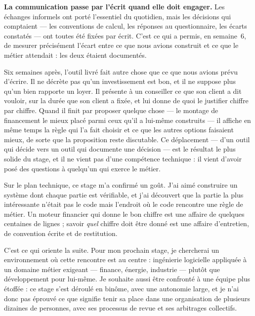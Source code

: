 \documentclass[12pt,a4paper]{article}
\begin{document}
\textbf{La communication passe par l'écrit quand elle doit engager.} Les
échanges informels ont porté l'essentiel du quotidien, mais les décisions qui
comptaient --- les conventions de calcul, les réponses au questionnaire, les
écarts constatés --- ont toutes été fixées par écrit. C'est ce qui a permis, en
semaine~6, de mesurer précisément l'écart entre ce que nous avions construit et
ce que le métier attendait : les deux étaient documentés.


Six semaines après, l'outil livré fait autre chose que ce que nous avions prévu
d'écrire. Il ne décrète pas qu'un investissement est bon, et il ne suppose plus
qu'un bien rapporte un loyer. Il présente à un conseiller ce que son client a dit
vouloir, sur la durée que son client a fixée, et lui donne de quoi le justifier
chiffre par chiffre. Quand il finit par proposer quelque chose --- le montage de
financement le mieux placé parmi ceux qu'il a lui-même construits --- il affiche
en même temps la règle qui l'a fait choisir et ce que les autres options
faisaient mieux, de sorte que la proposition reste discutable. Ce déplacement --- d'un outil qui décide
vers un outil qui documente une décision --- est le résultat le plus solide du
stage, et il ne vient pas d'une compétence technique : il vient d'avoir posé des
questions à quelqu'un qui exerce le métier.

Sur le plan technique, ce stage m'a confirmé un goût. J'ai aimé construire un
système dont chaque partie est vérifiable, et j'ai découvert que la partie la
plus intéressante n'était pas le code mais l'endroit où le code rencontre une
règle de métier. Un moteur financier qui donne le bon chiffre est une affaire de
quelques centaines de lignes ; savoir \emph{quel} chiffre doit être donné est
une affaire d'entretien, de convention écrite et de restitution.

C'est ce qui oriente la suite. Pour mon prochain stage, je chercherai un
environnement où cette rencontre est au centre : ingénierie logicielle appliquée
à un domaine métier exigeant --- finance, énergie, industrie --- plutôt que
développement pour lui-même. Je souhaite aussi être confronté à une équipe plus
étoffée : ce stage s'est déroulé en binôme, avec une autonomie large, et je n'ai
donc pas éprouvé ce que signifie tenir sa place dans une organisation de
plusieurs dizaines de personnes, avec ses processus de revue et ses arbitrages
collectifs.
\end{document}

